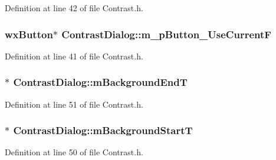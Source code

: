 Definition at line 42 of file Contrast.\+h.

\subsubsection[{\texorpdfstring{m\+\_\+p\+Button\+\_\+\+Use\+CurrentF}{m_pButton_UseCurrentF}}]{\setlength{\rightskip}{0pt plus 5cm}wx\+Button$\ast$ Contrast\+Dialog\+::m\+\_\+p\+Button\+\_\+\+Use\+CurrentF}\hypertarget{class_contrast_dialog_ac97972626256ba24449531dc2ef5a05e}{}\label{class_contrast_dialog_ac97972626256ba24449531dc2ef5a05e}


Definition at line 41 of file Contrast.\+h.

\subsubsection[{\texorpdfstring{m\+Background\+EndT}{mBackgroundEndT}}]{$\ast$ Contrast\+Dialog\+::m\+Background\+EndT}\hypertarget{class_contrast_dialog_a1b0b0cae075a2543856a2ea245610531}{}\label{class_contrast_dialog_a1b0b0cae075a2543856a2ea245610531}


Definition at line 51 of file Contrast.\+h.

\subsubsection[{\texorpdfstring{m\+Background\+StartT}{mBackgroundStartT}}]{$\ast$ Contrast\+Dialog\+::m\+Background\+StartT}\hypertarget{class_contrast_dialog_a03ece4032903821b920842734d148a61}{}\label{class_contrast_dialog_a03ece4032903821b920842734d148a61}


Definition at line 50 of file Contrast.\+h.

